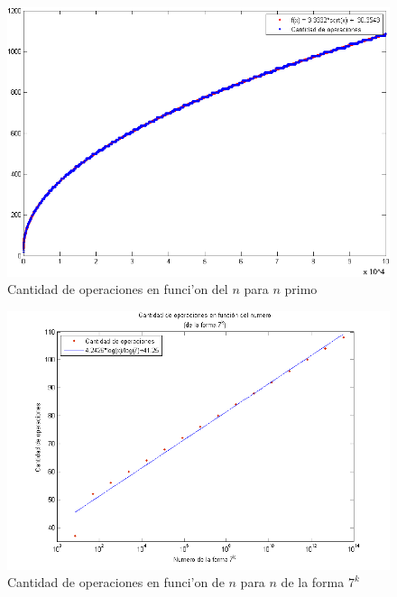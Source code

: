 \begin{figure}[H]
\centering
\includegraphics[scale=0.7]{../../codigo/ejercicio1/benchmark/graficos/primos/graficoPrimos.png}
\caption{Cantidad de operaciones en funci'on del $n$ para $n$ primo}
\label{Ej1fig2}
\end{figure}

\begin{figure}[H]
\centering
\includegraphics[scale=0.7]{../../codigo/ejercicio1/benchmark/graficos/potencias_de_7/graficoPotenciasDe7.png}
\caption{Cantidad de operaciones en funci'on de $n$ para $n$ de la forma $7^k$}
\label{Ej1fig3}
\end{figure}

